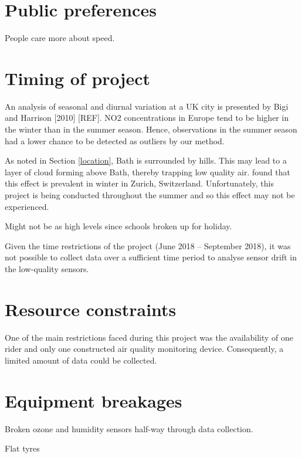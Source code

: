 \documentclass[11pt]{report}
\begin{document}
\section{Public preferences}

People care more about speed.

\section{Timing of project}

An analysis of seasonal and diurnal variation at a UK city is presented by Bigi and Harrison [2010] [REF]. NO2 concentrations in Europe tend to be higher in the winter than in the summer season. Hence, observations in the summer season had a lower chance to be detected as outliers by our method.

As noted in Section \ref{location}, Bath is surrounded by hills. This may lead to a layer of cloud forming above Bath, thereby trapping low quality air. \cite{Hasenfratz2015highresmapsTram} found that this effect is prevalent in winter in Zurich, Switzerland. Unfortunately, this project is being conducted throughout the summer and so this effect may not be experienced. 

Might not be as high levels since schools broken up for holiday.

Given the time restrictions of the project (June 2018 -- September 2018), it was not possible to collect data over a sufficient time period to analyse sensor drift in the low-quality sensors.

\section{Resource constraints}

One of the main restrictions faced during this project was the availability of one rider and only one constructed air quality monitoring device. Consequently, a limited amount of data could be collected.

\section{Equipment breakages}

Broken ozone and humidity sensors half-way through data collection.

Flat tyres



\end{document}
